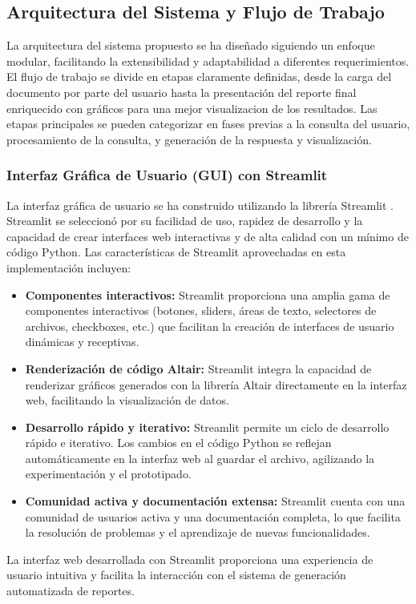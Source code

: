\subsection{Arquitectura del Sistema y Flujo de Trabajo}

La arquitectura del sistema propuesto se ha diseñado siguiendo un enfoque modular, facilitando la extensibilidad y adaptabilidad a diferentes requerimientos. El flujo de trabajo se divide en etapas claramente definidas, desde la carga del documento por parte del usuario hasta la presentación del reporte final enriquecido con gráficos para una mejor visualizacion de los resultados. Las etapas principales se pueden categorizar en fases previas a la consulta del usuario, procesamiento de la consulta, y generación de la respuesta y visualización.

\subsubsection{Interfaz Gráfica de Usuario (GUI) con Streamlit}

La interfaz gráfica de usuario se ha construido utilizando la librería Streamlit \cite{streamlit}.  Streamlit se seleccionó por su facilidad de uso,  rapidez de desarrollo y la capacidad de crear interfaces web interactivas y de alta calidad con un mínimo de código Python.  Las características de Streamlit aprovechadas en esta implementación incluyen:

\begin{itemize}
	\item \textbf{Componentes interactivos:}  Streamlit proporciona una amplia gama de componentes interactivos (botones, sliders, áreas de texto, selectores de archivos, checkboxes, etc.) que facilitan la creación de interfaces de usuario dinámicas y receptivas.
	\item \textbf{Renderización de código Altair:}  Streamlit integra la capacidad de renderizar gráficos generados con la librería Altair directamente en la interfaz web,  facilitando la visualización de datos.
	\item \textbf{Desarrollo rápido y iterativo:}  Streamlit permite un ciclo de desarrollo rápido e iterativo.  Los cambios en el código Python se reflejan automáticamente en la interfaz web al guardar el archivo,  agilizando la experimentación y el prototipado.
	\item \textbf{Comunidad activa y documentación extensa:}  Streamlit cuenta con una comunidad de usuarios activa y una documentación completa,  lo que facilita la resolución de problemas y el aprendizaje de nuevas funcionalidades.
\end{itemize}
La interfaz web desarrollada con Streamlit proporciona una experiencia de usuario intuitiva y facilita la interacción con el sistema de generación automatizada de reportes.

